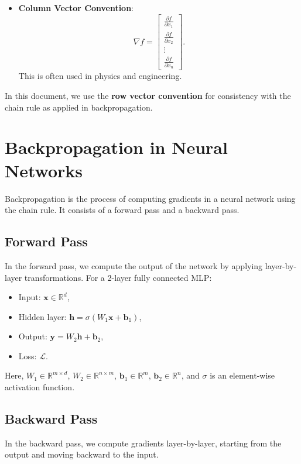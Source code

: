 \begin{notechapter}
\begin{itemize}
    \item \textbf{Column Vector Convention}:
    \[
    \nabla f = \begin{bmatrix} \frac{\partial f}{\partial x_1} \\ \frac{\partial f}{\partial x_2} \\ \vdots \\ \frac{\partial f}{\partial x_n} \end{bmatrix}.
    \]
    This is often used in physics and engineering.
\end{itemize}

In this document, we use the \textbf{row vector convention} for consistency with the chain rule as applied in backpropagation.

\section{Backpropagation in Neural Networks}
Backpropagation is the process of computing gradients in a neural network using the chain rule. It consists of a forward pass and a backward pass.

\subsection{Forward Pass}
In the forward pass, we compute the output of the network by applying layer-by-layer transformations. For a 2-layer fully connected MLP:
\begin{itemize}
    \item Input: \( \mathbf{x} \in \mathbb{R}^d \),
    \item Hidden layer: \( \mathbf{h} = \sigma(W_1 \mathbf{x} + \mathbf{b}_1) \),
    \item Output: \( \mathbf{y} = W_2 \mathbf{h} + \mathbf{b}_2 \),
    \item Loss: \( \mathcal{L} \).
\end{itemize}

Here, \( W_1 \in \mathbb{R}^{m \times d} \), \( W_2 \in \mathbb{R}^{n \times m} \), \( \mathbf{b}_1 \in \mathbb{R}^m \), \( \mathbf{b}_2 \in \mathbb{R}^n \), and \( \sigma \) is an element-wise activation function.

\subsection{Backward Pass}
In the backward pass, we compute gradients layer-by-layer, starting from the output and moving backward to the input.


\end{notechapter}
